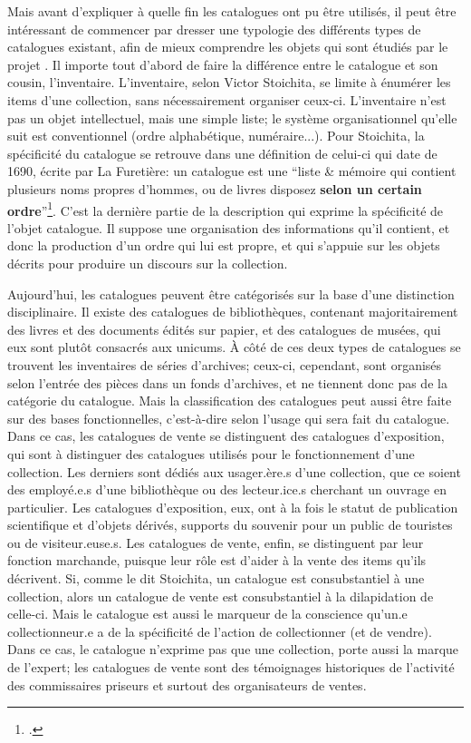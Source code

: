Mais avant d'expliquer à quelle fin les catalogues ont pu être utilisés, il peut être intéressant de commencer par dresser une typologie des différents types de catalogues existant, afin de mieux comprendre les objets qui sont étudiés par le projet \mssktb{}. Il importe tout d'abord de faire la différence entre le catalogue et son cousin, l'inventaire. L'inventaire, selon Victor Stoichita, se limite à énumérer les items d'une collection, sans nécessairement organiser ceux-ci. L'inventaire n'est pas un objet intellectuel, mais une simple liste; le système organisationnel qu'elle suit est conventionnel (ordre alphabétique, numéraire...). Pour Stoichita, la spécificité du catalogue se retrouve dans une définition de celui-ci qui date de 1690, écrite par La Furetière: un catalogue est une \enquote{liste \& mémoire qui contient plusieurs noms propres d'hommes, ou de livres disposez \textbf{selon un certain ordre}}\footcite[p. 122]{stoichita_instauration_1993}. C'est la dernière partie de la description qui exprime la spécificité de l'objet catalogue. Il suppose une organisation des informations qu'il contient, et donc la production d'un ordre qui lui est propre, et qui s'appuie sur les objets décrits pour produire un discours sur la collection.

Aujourd'hui, les catalogues peuvent être catégorisés sur la base d'une distinction disciplinaire. Il existe des catalogues de bibliothèques, contenant majoritairement des livres et des documents édités sur papier, et des catalogues de musées, qui eux sont plutôt consacrés aux unicums. À côté de ces deux types de catalogues se trouvent les inventaires de séries d'archives; ceux-ci, cependant, sont organisés selon l'entrée des pièces dans un fonds d'archives, et ne tiennent donc pas de la catégorie du catalogue. Mais la classification des catalogues peut aussi être faite sur des bases fonctionnelles, c'est-à-dire selon l'usage qui sera fait du catalogue. Dans ce cas, les catalogues de vente se distinguent des catalogues d'exposition, qui sont à distinguer des catalogues utilisés pour le fonctionnement d'une collection. Les derniers sont dédiés aux usager.ère.s d'une collection, que ce soient des employé.e.s d'une bibliothèque ou des lecteur.ice.s cherchant un ouvrage en particulier. Les catalogues d'exposition, eux, ont à la fois le statut de publication scientifique et d'objets dérivés, supports du souvenir pour un public de touristes ou de visiteur.euse.s. Les catalogues de vente, enfin, se distinguent par leur fonction marchande, puisque leur rôle est d'aider à la vente des items qu'ils décrivent. Si, comme le dit Stoichita, un catalogue est consubstantiel à une collection, alors un catalogue de vente est consubstantiel à la dilapidation de celle-ci. Mais le catalogue est aussi le marqueur de la conscience qu'un.e collectionneur.e a de la spécificité de l'action de collectionner (et de vendre). Dans ce cas, le catalogue n'exprime pas que une collection, porte aussi la marque de l'expert; les catalogues de vente sont des témoignages historiques de l'activité des commissaires priseurs et surtout des organisateurs de ventes.

